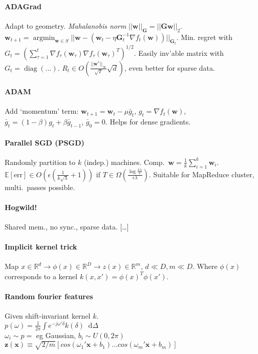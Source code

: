 \documentclass[11pt]{scrartcl}
\DeclareMathOperator{\diag}{diag}
\DeclareMathOperator{\argmin}{argmin}
\newcommand*\diff{\mathop{}\!\mathrm{d}}
\newcommand{\eps}{\epsilon}
\newcommand{\R}{\mathbb{R}}
\newcommand{\E}{\mathbb{E}}
\begin{document}
\begin{multicols}{3}
\paragraph{ADAGrad}
Adapt to geometry.
\emph{Mahalanobis norm} $||\bm w||_{\bm G} = ||\bm G\bm w||_2$. \\
$\bm w_{t+1}=\argmin_{\bm w\in S}||\bm w - (\bm w_t - \eta \bm G_t^{-1}\nabla f_t(\bm w))||_{\bm G_t}$.
Min. regret with $G_t = (\sum_{\tau = 1}^{t} \nabla f_\tau(\bm w_\tau)\nabla f_\tau(\bm w_\tau)^T)^{1/2}.$
Easily inv'able matrix with $G_t = \diag(\dots).$
$R_t \in O(\frac{||\bm w^*||_\infty}{\sqrt T}\sqrt d)$, even better for sparse data.

\paragraph{ADAM}
Add `momentum' term: $\bm w_{t+1} = \bm w_t - \mu\bar g_t$, $g_t = \nabla f_t(\bm w)$, $\bar g_t = (1-\beta)g_t + \beta \bar g_{t-1}$, $\bar g_0 = 0$.
Helps for dense gradients.

\paragraph{Parallel SGD (PSGD)}
Randomly partition to $k$ (indep.) machines. Comp.\ $\bm w = \frac{1}{k}\sum_{i=1}^k \bm w_i$.
$\E[\text{err}] \in O(\eps(\frac{1}{k\sqrt\lambda}+1))$ if $T \in \Omega(\frac{\log \frac{k\lambda}{\eps}}{\eps\lambda})$.
Suitable for MapReduce cluster, multi.\ passes possible.

\paragraph{Hogwild!}
Shared mem., no sync., sparse data. [\dots]

\paragraph{Implicit kernel trick}
Map $x \in \R^d \rightarrow \phi(x) \in \R^D \rightarrow z(x) \in \R^m$, $d \ll D, m \ll D$.
Where $\phi(x)$ corresponds to a kernel $k(x,x') = \phi(x)^T\phi(x')$.

\paragraph{Random fourier features}
Given shift-invariant kernel $k$.\\
$p(\omega)=\frac{1}{2\pi}\int e^{-j\omega'\delta}k(\delta) \diff\Delta$ \\
$\omega_i \sim p =$ eg Gaussian, $b_i \sim U(0, 2\pi)$\\
$\bm z(\bm x) \equiv \sqrt{2/m}[cos(\omega_1'\bm x+b_1) \dots cos(\omega_m'\bm x+b_m)]$ 


\end{multicols}
\end{document}
